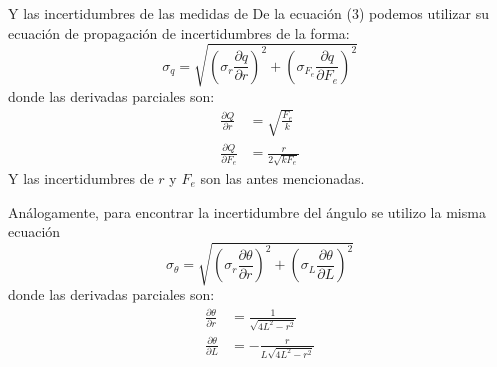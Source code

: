 \documentclass[letterpaper, 11 pt]{article}
\begin{document}
\begin{multicols*}{2}
Y las incertidumbres de las medidas de
De la ecuación (3) podemos utilizar su ecuación de propagación de incertidumbres de la forma:
\begin{equation}
     \sigma_{q}=\sqrt{\left(\sigma_r \frac{\partial q}{\partial r}\right)^2+\left(\sigma_{F_e} \frac{\partial q}{\partial F_e}\right)^2}
\end{equation}{}
donde las derivadas parciales son: \begin{equation*} 
\begin{split}
\frac{\partial Q}{\partial r} &=\sqrt{\frac{F_e}{k}} \\  
\frac{\partial Q}{\partial F_e}&=\frac{r}{2\sqrt{kF_{e}}} 
\end{split}
\end{equation*}
Y las incertidumbres de $r$ y $F_e$ son las antes mencionadas.

Análogamente, para encontrar la incertidumbre del ángulo se utilizo la misma ecuación
\begin{equation}
     \sigma_{\theta}=\sqrt{\left(\sigma_r \frac{\partial \theta}{\partial r}\right)^2+\left(\sigma_L \frac{\partial \theta}{\partial L}\right)^2}
\end{equation}
donde las derivadas parciales son: \begin{equation*} 
\begin{split}
\frac{\partial \theta}{\partial r}
&=\frac{1}{\sqrt{4L^2-r^2}} \\  
\frac{\partial \theta}{\partial L}&=-\frac{r}{L\sqrt{4L^2-r^2}} 
\end{split}
\end{equation*}


\end{multicols*}
\end{document}
